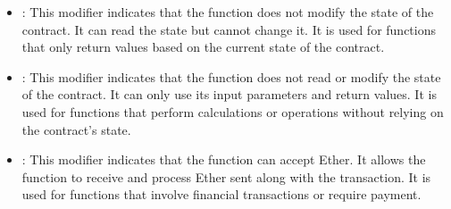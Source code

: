 \begin{itemize}
    \item {}: This modifier indicates that the function does not modify the state of the contract. It can read the state but cannot change it. It is used for functions that only return values based on the current state of the contract.
    \item {}: This modifier indicates that the function does not read or modify the state of the contract. It can only use its input parameters and return values. It is used for functions that perform calculations or operations without relying on the contract's state.
    \item {}: This modifier indicates that the function can accept Ether. It allows the function to receive and process Ether sent along with the transaction. It is used for functions that involve financial transactions or require payment.
\end{itemize}


